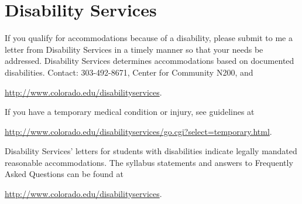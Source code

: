 \documentclass[11pt]{article}
\begin{document}
\section*{Disability Services}
\begin{description}
  \item If you qualify for accommodations because of a disability, please
  submit to me a letter from Disability Services in a timely manner so
  that your needs be addressed. Disability Services determines
  accommodations based on documented disabilities. Contact:
  303-492-8671, Center for Community N200, and
  \begin{center}
  \url{http://www.colorado.edu/disabilityservices}.
  \end{center}

\item If you have a temporary medical condition or injury, see
  guidelines at
  \begin{center}
    \url{http://www.colorado.edu/disabilityservices/go.cgi?select=temporary.html}.
  \end{center}

\item Disability Services' letters for students with disabilities
  indicate legally mandated reasonable accommodations. The syllabus
  statements and answers to Frequently Asked Questions can be found at
  \begin{center}
    \url{http://www.colorado.edu/disabilityservices}.
  \end{center}
\end{description}
\end{document}
